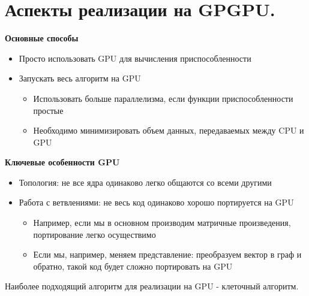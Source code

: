 \section{Аспекты реализации на GPGPU.}
\textbf{Основные способы}
\begin{itemize}
    \item Просто использовать GPU для вычисления приспособленности

    \item Запускать весь алгоритм на GPU
    \begin{itemize}
        \item Использовать больше параллелизма, если функции приспособленности простые
        \item Необходимо минимизировать объем данных, передаваемых между CPU и GPU 
    \end{itemize}
    
\end{itemize}
\textbf{Ключевые особенности GPU }
\begin{itemize}
    \item Топология: не все ядра одинаково легко общаются со всеми другими
    \item Работа с ветвлениями: не весь код одинаково хорошо портируется на GPU
    \begin{itemize}
        \item Например, если мы в основном производим матричные произведения, портирование легко осуществимо
        \item Если мы, например, меняем представление: преобразуем вектор в граф и обратно, такой код будет сложно портировать на GPU
    \end{itemize}
\end{itemize}

Наиболее подходящий алгоритм для реализации на GPU - клеточный алгоритм. 